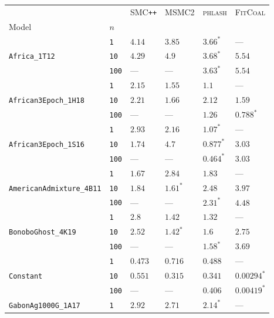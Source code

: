 \begin{footnotesize}
\begin{tabular}{llllll}
\toprule
 &  & \textsc{SMC}\texttt{{++}} & \textsc{MSMC2} & \textsc{phlash} & \textsc{FitCoal} \\
Model & $n$ &  &  &  &  \\
\midrule
\multirow[c]{3}{*}{\texttt{Africa\_1T12}} & \texttt{1} & $4.14$ & $3.85$ & $\mathbf{3.66}^*$ & --- \\
 & \texttt{10} & $4.29$ & $4.9$ & $\mathbf{3.68}^*$ & $5.54$ \\
 & \texttt{100} & --- & --- & $\mathbf{3.63}^*$ & $5.54$ \\
\cline{1-6}
\multirow[c]{3}{*}{\texttt{African3Epoch\_1H18}} & \texttt{1} & $2.15$ & $1.55$ & $\mathbf{1.1}$ & --- \\
 & \texttt{10} & $2.21$ & $1.66$ & $2.12$ & $\mathbf{1.59}$ \\
 & \texttt{100} & --- & --- & $1.26$ & $\mathbf{0.788}^*$ \\
\cline{1-6}
\multirow[c]{3}{*}{\texttt{African3Epoch\_1S16}} & \texttt{1} & $2.93$ & $2.16$ & $\mathbf{1.07}^*$ & --- \\
 & \texttt{10} & $1.74$ & $4.7$ & $\mathbf{0.877}^*$ & $3.03$ \\
 & \texttt{100} & --- & --- & $\mathbf{0.464}^*$ & $3.03$ \\
\cline{1-6}
\multirow[c]{3}{*}{\texttt{AmericanAdmixture\_4B11}} & \texttt{1} & $\mathbf{1.67}$ & $2.84$ & $1.83$ & --- \\
 & \texttt{10} & $1.84$ & $\mathbf{1.61}^*$ & $2.48$ & $3.97$ \\
 & \texttt{100} & --- & --- & $\mathbf{2.31}^*$ & $4.48$ \\
\cline{1-6}
\multirow[c]{3}{*}{\texttt{BonoboGhost\_4K19}} & \texttt{1} & $2.8$ & $1.42$ & $\mathbf{1.32}$ & --- \\
 & \texttt{10} & $2.52$ & $\mathbf{1.42}^*$ & $1.6$ & $2.75$ \\
 & \texttt{100} & --- & --- & $\mathbf{1.58}^*$ & $3.69$ \\
\cline{1-6}
\multirow[c]{3}{*}{\texttt{Constant}} & \texttt{1} & $\mathbf{0.473}$ & $0.716$ & $0.488$ & --- \\
 & \texttt{10} & $0.551$ & $0.315$ & $0.341$ & $\mathbf{0.00294}^*$ \\
 & \texttt{100} & --- & --- & $0.406$ & $\mathbf{0.00419}^*$ \\
\cline{1-6}
\multirow[c]{3}{*}{\texttt{GabonAg1000G\_1A17}} & \texttt{1} & $2.92$ & $2.71$ & $\mathbf{2.14}^*$ & --- \\

\end{tabular}
\end{footnotesize}
